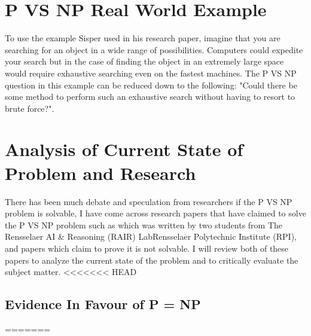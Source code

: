 \documentclass{report}
\begin{document}
\section{P VS NP Real World Example}
To use the example Sisper used in his research paper\cite{HistoryOfPVsNP}, imagine that you are searching for an object in a wide range of possibilities.  Computers could expedite your search but in the case of finding the object in an extremely large space would require exhaustive searching even on the fastest machines.  The P VS NP question in this example can be reduced down to the following: "Could there be some method to perform such an exhaustive search without having to resort to brute force?".
\section{Analysis of Current State of Problem and Research}
There has been much debate and speculation from researchers if the P VS NP problem is solvable, I have come across research papers that have claimed to solve the P VS NP problem such as\cite{PVsNPSolved} which was written by two students from The Rensselaer AI \& Reasoning (RAIR) LabRensselaer Polytechnic Institute (RPI), and papers which claim to prove it is not solvable\cite{P!=NP}. I will review both of these papers to analyze the current state of the problem and to critically evaluate the subject matter.
<<<<<<< HEAD
\subsection{Evidence In Favour of P = NP}
=======
\end{document}

